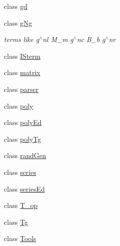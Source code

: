 \begin{DoxyCompactItemize}
class \mbox{\hyperlink{classetvo_i_i_1_1gd}{gd}}
\item 
class \mbox{\hyperlink{classetvo_i_i_1_1g_ng}{g\+Ng}}
\begin{DoxyCompactList}\small\item\em terms like g$^\wedge$nl M\+\_\+m g$^\wedge$nc B\+\_\+b g$^\wedge$nr \end{DoxyCompactList}\item 
class \mbox{\hyperlink{classetvo_i_i_1_1_i_sterm}{I\+Sterm}}
\item 
class \mbox{\hyperlink{classetvo_i_i_1_1matrix}{matrix}}
\item 
class \mbox{\hyperlink{classetvo_i_i_1_1parser}{parser}}
\item 
class \mbox{\hyperlink{classetvo_i_i_1_1poly}{poly}}
\item 
class \mbox{\hyperlink{classetvo_i_i_1_1poly_ed}{poly\+Ed}}
\item 
class \mbox{\hyperlink{classetvo_i_i_1_1poly_tg}{poly\+Tg}}
\item 
class \mbox{\hyperlink{classetvo_i_i_1_1rand_gen}{rand\+Gen}}
\item 
class \mbox{\hyperlink{classetvo_i_i_1_1series}{series}}
\item 
class \mbox{\hyperlink{classetvo_i_i_1_1series_ed}{series\+Ed}}
\item 
class \mbox{\hyperlink{classetvo_i_i_1_1_t__op}{T\+\_\+op}}
\item 
class \mbox{\hyperlink{classetvo_i_i_1_1_tg}{Tg}}
\item 
class \mbox{\hyperlink{classetvo_i_i_1_1_tools}{Tools}}
\end{DoxyCompactItemize}
